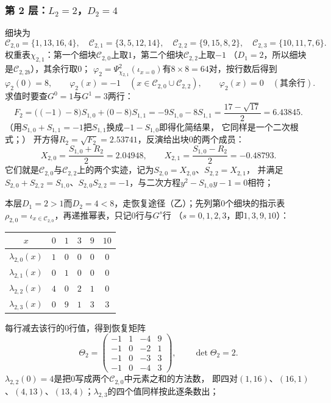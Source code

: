 \documentclass[UTF8,a4paper,11pt]{ctexart}
\begin{document}
\subsubsection{第 2 层：$L_2=2$，$D_2=4$}
细块为
\[
 \mathscr{C}_{2,0}=\{1,13,16,4\},\quad \mathscr{C}_{2,1}=\{3,5,12,14\},\quad
 \mathscr{C}_{2,2}=\{9,15,8,2\},\quad \mathscr{C}_{2,3}=\{10,11,7,6\}.
\]
权重表$\chi_{2,1}$：第一个细块$\mathscr{C}_{2,0}$上取$1$，第二个细块$\mathscr{C}_{2,2}$上取$-1$
（$D_1=2$，所以细块是$\mathscr{C}_{2,2b}$），其余行取$0$；
$\varphi_2=\Psi_{\chi_{2,1}}^{2}(\iota_{x=0})$有$8\times8=64$对，按行数后得到
\[
 \varphi_2(0)=8,\qquad
 \varphi_2(x)=-1\quad(x\in\mathscr{C}_{2,0}\cup\mathscr{C}_{2,2}),\qquad
 \varphi_2(x)=0\quad(\text{其余行}).
\]
求值时要查$G^0=1$与$G^1=3$两行：
\[
 F_2=\bigl((-1)-8\bigr)S_{1,0}+\bigl(0-8\bigr)S_{1,1}=-9S_{1,0}-8S_{1,1}
 =\frac{17-\sqrt{17}}{2}=6.43845.
\]
（用$S_{1,0}+S_{1,1}=-1$把$S_{1,1}$换成$-1-S_{1,0}$即得化简结果，
它同样是一个二次根式；）
开方得$R_2=\sqrt{F_2}=2.53741$，反演给出块$0$的两个成员：
\[
 X_{2,0}=\frac{S_{1,0}+R_2}{2}=2.04948,\qquad
 X_{2,1}=\frac{S_{1,0}-R_2}{2}=-0.48793.
\]
它们就是$\mathscr{C}_{2,0}$与$\mathscr{C}_{2,2}$上的两个实迹，记为$S_{2,0}=X_{2,0}$、$S_{2,2}=X_{2,1}$，
并满足$S_{2,0}+S_{2,2}=S_{1,0}$、$S_{2,0}S_{2,2}=-1$，与二次方程$y^2-S_{1,0}y-1=0$相符；

本层$D_1=2>1$而$D_2=4<8$，走恢复途径（乙）；先列第$0$个细块的指示表
$\rho_{2,0}=\iota_{x\in\mathscr{C}_{2,0}}$，再递推幂表，只记$0$行与$G^s$行
（$s=0,1,2,3$，即$1,3,9,10$）：
\begin{center}
\begin{tabular}{c|ccccc}
\toprule
$x$ & $0$ & $1$ & $3$ & $9$ & $10$\\
\midrule
$\lambda_{2,0}(x)$ & $1$&$0$&$0$&$0$&$0$\\
$\lambda_{2,1}(x)$ & $0$&$1$&$0$&$0$&$0$\\
$\lambda_{2,2}(x)$ & $4$&$0$&$2$&$1$&$0$\\
$\lambda_{2,3}(x)$ & $0$&$9$&$1$&$3$&$3$\\
\bottomrule
\end{tabular}
\end{center}
每行减去该行的$0$行值，得到恢复矩阵
\[
 \Theta_2=\begin{pmatrix}
 -1&1&-4&9\\
 -1&0&-2&1\\
 -1&0&-3&3\\
 -1&0&-4&3
 \end{pmatrix},
 \qquad \det \Theta_2=2 .
\]
$\lambda_{2,2}(0)=4$是把$0$写成两个$\mathscr{C}_{2,0}$中元素之和的方法数，
即四对$(1,16)$、$(16,1)$、$(4,13)$、$(13,4)$；$\lambda_{2,3}$的四个值同样按此逐条数出；\par
\end{document}
